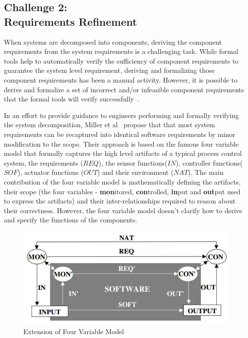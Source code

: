 \subsection{Challenge 2: \\Requirements Refinement}

When systems are decomposed into components, deriving the component requirements from the system requirements is a challenging task. While formal tools help to automatically verify the sufficiency of component requirements to guarantee the system level requirement, deriving and formalizing those component requirements has been a manual activity. However, it is possible to derive and formalize a set of incorrect and/or infeasible component requirements that the formal tools will verify successfully~\cite{gacek2015towards}.

In an effort to provide guidance to engineers performing and formally verifying the system decomposition, Miller et al~\cite{extending4varmodel} propose that that most system requirements can be recaptured into identical software requirements by minor modification to the scope. Their approach is based on the famous four variable model that formally captures the high level artifacts of a typical process control system, the requirements ($REQ$), the sensor functions($IN$), controller functions($SOF$), actuator functions ($OUT$) and their environment ($NAT$). The main contribution of the four variable model is mathematically defining the artifacts, their scope (the four variables - \textbf{mon}itored, \textbf{con}trolled, \textbf{in}put and \textbf{out}put used to express the artifacts) and their inter-relationships required to reason about their correctness. However, the four variable model doesn't clarify how to derive and specify the functions of the components.

\begin{figure}[h!]
    \centering
    \includegraphics[scale=0.6] {images/FourVarExtn.jpg}
    \caption{Extension of Four Variable Model}
    \label{fig:extn-four-var}
 \end{figure}

